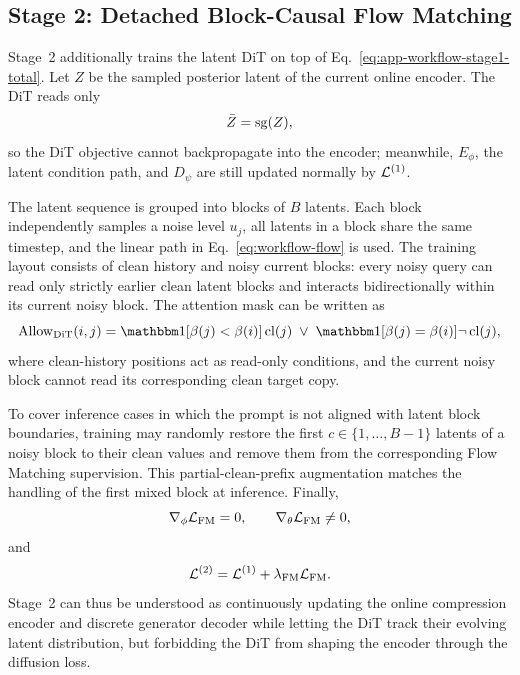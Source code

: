\subsection{Stage 2: Detached Block-Causal Flow Matching}
\label{app:stage2-details}

Stage~2 additionally trains the latent DiT on top of Eq.~\eqref{eq:app-workflow-stage1-total}. Let $Z$ be the sampled posterior latent of the current online encoder. The DiT reads only
\begin{equation}
    \bar Z=\operatorname{sg}(Z),
    \label{eq:app-workflow-detached-z}
\end{equation}
so the DiT objective cannot backpropagate into the encoder; meanwhile, $E_\phi$, the latent condition path, and $D_\psi$ are still updated normally by $\mathcal{L}^{(1)}$.

The latent sequence is grouped into blocks of $B$ latents. Each block independently samples a noise level $u_j$, all latents in a block share the same timestep, and the linear path in Eq.~\eqref{eq:workflow-flow} is used. The training layout consists of clean history and noisy current blocks: every noisy query can read only strictly earlier clean latent blocks and interacts bidirectionally within its current noisy block. The attention mask can be written as
\begin{equation}
    \operatorname{Allow}_{\mathrm{DiT}}(i,j)
    =\ind[\beta(j)<\beta(i)]\operatorname{cl}(j)
     \;\vee\;
     \ind[\beta(j)=\beta(i)]\neg\operatorname{cl}(j),
    \label{eq:app-workflow-dit-mask}
\end{equation}
where clean-history positions act as read-only conditions, and the current noisy block cannot read its corresponding clean target copy.

To cover inference cases in which the prompt is not aligned with latent block boundaries, training may randomly restore the first $c\in\{1,\ldots,B-1\}$ latents of a noisy block to their clean values and remove them from the corresponding Flow Matching supervision. This partial-clean-prefix augmentation matches the handling of the first mixed block at inference. Finally,
\begin{equation}
    \nabla_\phi\mathcal{L}_{\mathrm{FM}}=0,
    \qquad
    \nabla_\theta\mathcal{L}_{\mathrm{FM}}\neq0,
    \label{eq:app-workflow-full-detach}
\end{equation}
and
\begin{equation}
    \mathcal{L}^{(2)}
    =\mathcal{L}^{(1)}+\lambda_{\mathrm{FM}}\mathcal{L}_{\mathrm{FM}}.
    \label{eq:app-workflow-stage2-total}
\end{equation}
Stage~2 can thus be understood as continuously updating the online compression encoder and discrete generator decoder while letting the DiT track their evolving latent distribution, but forbidding the DiT from shaping the encoder through the diffusion loss.

